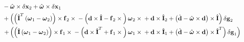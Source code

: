 \documentclass[10pt,dvips,fleqn,subeqn]{report}
\newcommand{\T}[1]{\bm{\mathbf{#1}}}
\newcommand{\TT}[1]{\bm{\mathbf{#1}}}
\begin{document}
\begin{align}
	& \quad\quad\quad
		- \hat{\T{\omega}}\times\delta\T{x}_2
		+ \hat{\T{\omega}}\times\delta\T{x}_1
	\nonumber \\
	& \quad\quad\quad
		+ \plbr{
			\plbr{
				\hat{\TT{I}}^T \plbr{
					\T{\omega}_1
					- \T{\omega}_2
				}
			} \times \T{f}_2\times{}
			- \plbr{
				\T{d}\times\hat{\TT{I}}
				- \T{f}_2\times{}
			} \T{\omega}_2\times{}
			+ \T{d}\times\hat{\TT{I}}_2
			+ \plbr{
				\dot{\T{d}}
				- \hat{\T{\omega}}\times\T{d}
			}\times\hat{\TT{I}}
		} \delta\T{g}_2
	\nonumber \\
	& \quad\quad\quad
	\rplbr{
		+ \plbr{
			\plbr{
				\hat{\TT{I}} \plbr{
					\T{\omega}_1
					- \T{\omega}_2
				}
			} \times \T{f}_1\times{}
			- \plbr{
				\T{d}\times\hat{\TT{I}}^T
				+ \T{f}_1\times{}
			}\T{\omega}_1\times{}
			+ \T{d}\times\hat{\TT{I}}_1
			+ \plbr{
				\dot{\T{d}}
				- \hat{\T{\omega}}\times\T{d}
			}\times\hat{\TT{I}}^T
		} \delta\T{g}_1
	}
\end{align}

\end{document}
